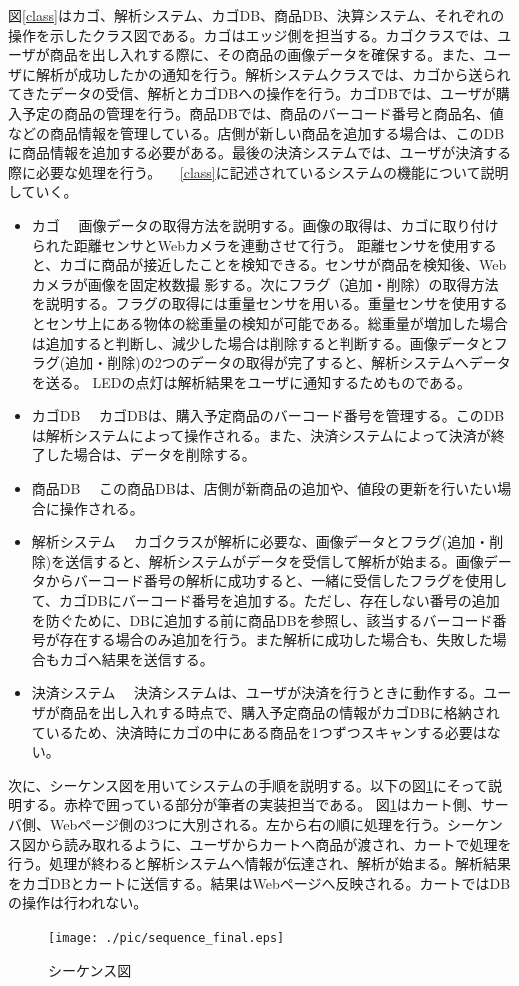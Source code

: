 図\ref{class}はカゴ、解析システム、カゴDB、商品DB、決算システム、それぞれの操作を示したクラス図である。カゴはエッジ側を担当する。カゴクラスでは、ユーザが商品を出し入れする際に、その商品の画像データを確保する。また、ユーザに解析が成功したかの通知を行う。解析システムクラスでは、カゴから送られてきたデータの受信、解析とカゴDBへの操作を行う。カゴDBでは、ユーザが購入予定の商品の管理を行う。商品DBでは、商品のバーコード番号と商品名、値などの商品情報を管理している。店側が新しい商品を追加する場合は、このDBに商品情報を追加する必要がある。最後の決済システムでは、ユーザが決済する際に必要な処理を行う。
　\ref{class}に記述されているシステムの機能について説明していく。
\begin{itemize}
\item カゴ
　画像データの取得方法を説明する。画像の取得は、カゴに取り付けられた距離センサとWebカメラを連動させて行う。
距離センサを使用すると、カゴに商品が接近したことを検知できる。センサが商品を検知後、Webカメラが画像を固定枚数撮
影する。次にフラグ（追加・削除）の取得方法を説明する。フラグの取得には重量センサを用いる。重量センサを使用するとセンサ上にある物体の総重量の検知が可能である。総重量が増加した場合は追加すると判断し、減少した場合は削除すると判断する。画像データとフラグ(追加・削除)の2つのデータの取得が完了すると、解析システムへデータを送る。
LEDの点灯は解析結果をユーザに通知するためものである。
\item カゴDB
　カゴDBは、購入予定商品のバーコード番号を管理する。このDBは解析システムによって操作される。また、決済システムによって決済が終了した場合は、データを削除する。
\item 商品DB
　この商品DBは、店側が新商品の追加や、値段の更新を行いたい場合に操作される。
\item 解析システム
　カゴクラスが解析に必要な、画像データとフラグ(追加・削除)を送信すると、解析システムがデータを受信して解析が始まる。画像データからバーコード番号の解析に成功すると、一緒に受信したフラグを使用して、カゴDBにバーコード番号を追加する。ただし、存在しない番号の追加を防ぐために、DBに追加する前に商品DBを参照し、該当するバーコード番号が存在する場合のみ追加を行う。また解析に成功した場合も、失敗した場合もカゴへ結果を送信する。
\item 決済システム
　決済システムは、ユーザが決済を行うときに動作する。ユーザが商品を出し入れする時点で、購入予定商品の情報がカゴDBに格納されているため、決済時にカゴの中にある商品を1つずつスキャンする必要はない。
\end{itemize}

次に、シーケンス図を用いてシステムの手順を説明する。以下の図\ref{sequence}にそって説明する。赤枠で囲っている部分が筆者の実装担当である。
図\ref{sequence}はカート側、サーバ側、Webページ側の3つに大別される。左から右の順に処理を行う。シーケンス図から読み取れるように、ユーザからカートへ商品が渡され、カートで処理を行う。処理が終わると解析システムへ情報が伝達され、解析が始まる。解析結果をカゴDBとカートに送信する。結果はWebページへ反映される。カートではDBの操作は行われない。


\begin{figure}[htbp]
\centering
\texttt{[image: ./pic/sequence\_final.eps]}
\caption{シーケンス図}
\label{sequence}
\end{figure}



